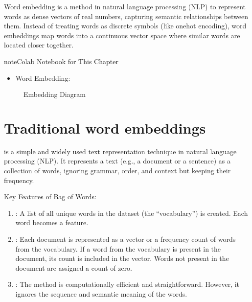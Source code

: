 \documentclass[letterpaper,11pt,english]{sphinxmanual}
\begin{document}
\sphinxAtStartPar
Word embedding is a method in natural language processing (NLP) to represent words as dense
vectors of real numbers, capturing semantic relationships between them. Instead of treating
words as discrete symbols (like one\sphinxhyphen{}hot encoding), word embeddings map words into a
continuous vector space where similar words are located closer together.

\begin{sphinxadmonition}{note}{Colab Notebook for This Chapter}
\begin{itemize}
\item {} 
\sphinxAtStartPar
Word Embedding: 

\end{itemize}
\end{sphinxadmonition}

\begin{figure}[htbp]
\centering
\capstart

\noindent{}
\caption{Embedding Diagram}\label{\detokenize{embedding:id2}}\label{\detokenize{embedding:fig-embedding}}\end{figure}


\section{Traditional word embeddings}
\label{\detokenize{embedding:traditional-word-embeddings}}
\sphinxAtStartPar
{} is a simple and widely used text representation technique in natural
language processing (NLP). It represents a text (e.g., a document or a sentence) as a collection
of words, ignoring grammar, order, and context but keeping their frequency.

\sphinxAtStartPar
Key Features of Bag of Words:
\begin{enumerate}
%
\item {} 
\sphinxAtStartPar
{}:
\sphinxhyphen{} A list of all unique words in the dataset (the “vocabulary”) is created.
\sphinxhyphen{} Each word becomes a feature.

\item {} 
\sphinxAtStartPar
{}:
\sphinxhyphen{} Each document is represented as a vector or a frequency count of words from the vocabulary.
\sphinxhyphen{} If a word from the vocabulary is present in the document, its count is included in the vector.
\sphinxhyphen{} Words not present in the document are assigned a count of zero.

\item {} 
\sphinxAtStartPar
{}:
\sphinxhyphen{} The method is computationally efficient and straightforward.
\sphinxhyphen{} However, it ignores the sequence and semantic meaning of the words.

\end{enumerate}
\end{document}
